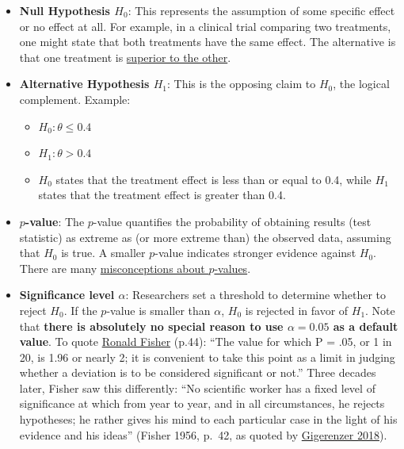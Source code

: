 \documentclass[
]{book}
\providecommand{\tightlist}{%
  \setlength{\itemsep}{0pt}\setlength{\parskip}{0pt}}
\begin{document}
\begin{itemize}
\item
  \textbf{Null Hypothesis \(H_0\)}: This represents the assumption of some specific effect or no effect at all.
  For example, in a clinical trial comparing two treatments, one might state that both treatments have the same effect.
  The alternative is that one treatment is \href{https://en.wikipedia.org/wiki/Clinical_study_design\#Other_terms}{superior to the other}.
\item
  \textbf{Alternative Hypothesis \(H_1\)}: This is the opposing claim to \(H_0\), the logical complement.
  Example:

  \begin{itemize}
  \tightlist
  \item
    \(H_0: \theta \le 0.4\)
  \item
    \(H_1: \theta > 0.4\)
  \item
    \(H_0\) states that the treatment effect is less than or equal to 0.4,
    while \(H_1\) states that the treatment effect is greater than 0.4.
  \end{itemize}
\item
  \textbf{\(p\)-value}: The \(p\)-value quantifies the probability of obtaining results (test statistic) as extreme as (or more extreme than)
  the observed data, assuming that \(H_0\) is true.
  A smaller \(p\)-value indicates stronger evidence against \(H_0\).
  There are many \href{https://sixsigmadsi.com/wp-content/uploads/2020/10/A-Dirty-Dozen-Twelve-P-Value-Misconceptions.pdf}{misconceptions about \(p\)-values}.
\item
  \textbf{Significance level \(\alpha\)}: Researchers set a threshold to determine whether to reject \(H_0\).
  If the \(p\)-value is smaller than \(\alpha\), \(H_0\) is rejected in favor of \(H_1\).
  Note that \textbf{there is absolutely no special reason to use \(\alpha = 0.05\) as a default value}.
  To quote \href{https://link.springer.com/chapter/10.1007/978-1-4612-4380-9_6}{Ronald Fisher} (p.44):
  ``The value for which P = .05, or 1 in 20, is 1.96 or nearly 2; it is convenient to take this
  point as a limit in judging whether a deviation is to be considered significant or not.''
  Three decades later, Fisher saw this differently: ``No scientific worker has a fixed level of
  significance at which from year to year, and in all circumstances, he rejects hypotheses;
  he rather gives his mind to each particular case in the light of his evidence and his ideas''
  (Fisher 1956, p.~42, as quoted by
  \href{https://doi.org/10.1177/2515245918771329}{Gigerenzer 2018}).
\end{itemize}
\end{document}
